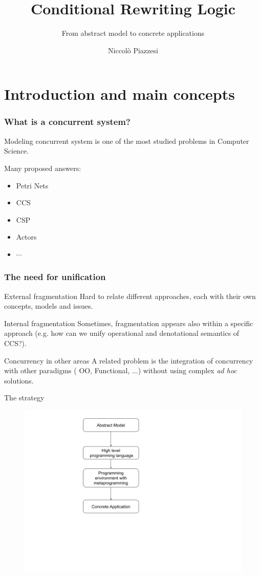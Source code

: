 \documentclass{beamer}
\title{Conditional Rewriting Logic}
\subtitle{From  abstract model to concrete applications}
\author{Niccolò Piazzesi}
\institute{
    Università degli studi di Pisa
}
\begin{document}
\frame{\titlepage}

\section{Introduction and main concepts}
\begin{frame}
    \frametitle{What is a concurrent system?}
    Modeling concurrent system is one of the most studied problems in Computer Science.

    \bigskip
    Many proposed answers:\begin{itemize}
        \item Petri Nets 
        \item CCS
        \item CSP 
        \item Actors
        \item $\cdots$
    \end{itemize}
\end{frame}
\begin{frame}
    \frametitle{The need for unification}
        \begin{block}{External fragmentation}
            Hard to relate different approaches, each with their own concepts, models and issues.
        \end{block}
    \begin{block}{Internal fragmentation}
        Sometimes, fragmentation appears also within a specific approach (e.g. how can we unify operational and denotational semantics of CCS?).
    \end{block}
    \begin{block}{Concurrency in other areas}
        A related problem is the integration of concurrency with other paradigms ( OO, Functional, ...)
        without using complex \emph{ad hoc} solutions.
    \end{block}
\end{frame}
\begin{frame}{The strategy}
    \begin{figure}
        \includegraphics[height=\textheight]{img/sec0.png}
    \end{figure}
\end{frame}
\end{document}
